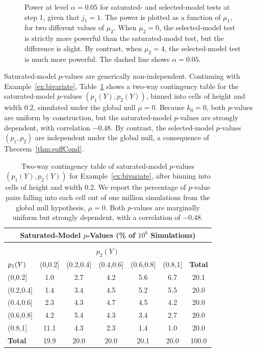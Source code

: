 \documentclass{article}
\begin{document}
\begin{figure}
\begin{subfigure}[t]{.4\textwidth}
  \end{subfigure}
  \caption{Power at level $\alpha=0.05$ for saturated- and selected-model tests at step 1, given that $j_1=1$. The power is plotted as a function of $\mu_1$, for two different values of $\mu_2$. When $\mu_2=0$, the selected-model test is strictly more powerful than the saturated-model test, but the difference is slight. By contrast, when $\mu_2=4$, the selected-model test is much more powerful. The dashed line shows $\alpha=0.05$.}
   \label{fig:bv_powCurves}
\end{figure}

Saturated-model $p$-values are generically non-independent. Continuing with Example~\ref{ex:bivariate}, Table~\ref{tab:bv_twoWayTable} shows a two-way contingency table for the saturated-model $p$-values $(p_1(Y), p_2(Y))$, binned into cells of height and width 0.2, simulated under the global null $\mu=0$. Because $k_0=0$, both $p$-values are uniform by construction, but the saturated-model $p$-values are strongly dependent, with correlation $-0.48$. By contrast, the selected-model $p$-values $(p_1,p_2)$ are independent under the global null, a consequence of Theorem~\ref{thm:suffCond}.

\begin{table}[ht]
  \centering
  \begin{tabular}{l|ccccc|c}
    \multicolumn{7}{c}{Saturated-Model $p$-Values 
      (\% of $10^6$ Simulations)}\\[7pt]
    \hline
    \multicolumn{7}{c}{}\\[-1.5ex]
    \multicolumn{7}{c}{$p_2(Y)$}\\[5pt]
    ${\large p_1(Y)}$ & (0,0.2] & (0.2,0.4] & (0.4,0.6] & (0.6,0.8] & (0.8,1] & \textbf{Total} \\ 
    \hline
    (0,0.2] & 1.0 & 2.7 & 4.2 & 5.6 & 6.7 & 20.1 \\ 
    (0.2,0.4] & 1.4 & 3.4 & 4.5 & 5.2 & 5.5 & 20.0 \\ 
    (0.4,0.6] & 2.3 & 4.3 & 4.7 & 4.5 & 4.2 & 20.0 \\ 
    (0.6,0.8] & 4.2 & 5.4 & 4.3 & 3.4 & 2.7 & 20.0 \\ 
    (0.8,1] & 11.1 & 4.3 & 2.3 & 1.4 & 1.0 & 20.0 \\ 
    \hline
    \textbf{Total} & 19.9 & 20.0 & 20.0 & 20.1 & 20.0 & 100.0 \\ 
    \hline
  \end{tabular}
  \caption{Two-way contingency table of saturated-model $p$-values $(p_1(Y), p_2(Y))$ for Example~\ref{ex:bivariate}, after binning into cells of height and width 0.2. We report the percentage of $p$-value pairs falling into each cell out of one million simulations from the global null hypothesis, $\mu=0$. Both $p$-values are marginally uniform but strongly dependent, with a correlation of $-0.48$.}
\label{tab:bv_twoWayTable}
\end{table}
\end{document}
